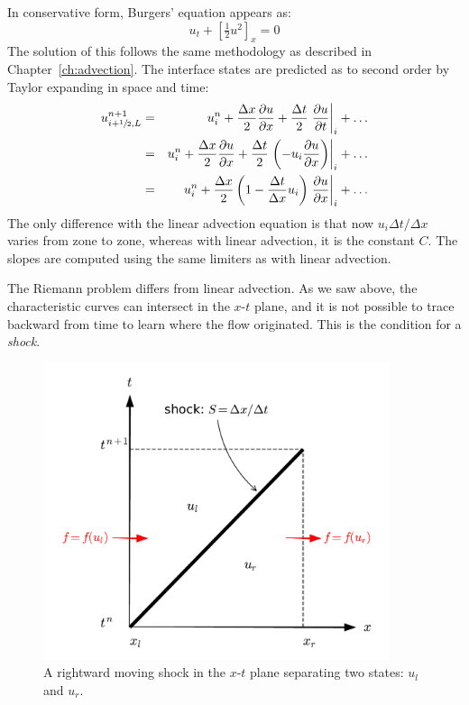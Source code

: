 In conservative form, Burgers' equation appears as:
\begin{equation}
u_t + \left [\tfrac{1}{2} u^2 \right ]_x = 0
\end{equation}
The solution of this follows the same methodology as described in
Chapter~\ref{ch:advection}.  The interface states are predicted as to
second order by Taylor expanding in space and time:
\begin{eqnarray}
u^{n+1}_{i+{\sfrac{1}{2}},L}
 &=& u^n_i + \frac{\Delta x}{2} \frac{\partial u}{\partial x}
    + \frac{\Delta t}{2} \left . \frac{\partial u}{\partial t} \right |_i
    + \ldots \\
 &=& u^n_i + \frac{\Delta x}{2} \frac{\partial u}{\partial x}
    + \frac{\Delta t}{2} \left . \left (-u_i \frac{\partial u}{\partial x}
         \right ) \right |_i
    + \ldots \\
 &=& u^n_i + \frac{\Delta x}{2}
   \left ( 1 - \frac{\Delta t}{\Delta x} u_i \right )
   \left . \frac{\partial u}{\partial x} \right |_i + \ldots
\end{eqnarray}
The only difference with the linear advection equation is that now
$u_i \Delta t/\Delta x$ varies from zone to zone, whereas with linear
advection, it is the constant $C$.  The slopes are computed using
the same limiters as with linear advection.

The Riemann problem differs from linear advection.  As we saw above,
the characteristic curves can intersect in the $x$-$t$ plane, and it
is not possible to trace backward from time to learn where the flow
originated.  This is the condition for a {\em shock}.

\begin{figure}[t]
\centering
\includegraphics[width=4in]{rh}
\caption[Rankine-Hugoniot conditions]{\label{fig:rh} A rightward moving shock in the $x$-$t$
   plane separating two states: $u_l$ and $u_r$.}
\end{figure}

